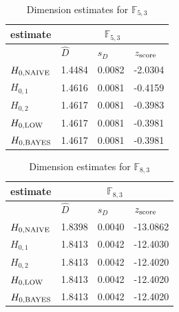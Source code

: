 \documentclass[a4paper,10pt]{article}
\begin{document}
\begin{thebibliography}{99}
\begin{table}[H] 
\begin{center}
\caption{Dimension estimates for $\mathbb{F}_{5,3}$}
\label{tab:est3}
\begin{tabular}{|l|l|l|l|}
\hline
 estimate & \multicolumn{3}{c|}{$\mathbb{F}_{5,3}$} \\
\hline
 & $\hat{D}$ & $s_{D}$ & $z_{\mbox{\scriptsize{score}}}$ \\
\hline 
$ H_{0,\mbox{\scriptsize{NAIVE}}}  $ & 1.4484 & 0.0082 & -2.0304 \\ 
\hline 
$ H_{0,1} $ & 1.4616 & 0.0081 & -0.4159 \\ 
\hline 
$ H_{0,2} $ & 1.4617 & 0.0081 & -0.3983 \\ 
\hline 
$ H_{0,\mbox{\scriptsize{LOW}}} $ & 1.4617 & 0.0081 & -0.3981 \\ 
\hline 
$ H_{0,\mbox{\scriptsize{BAYES}}} $ & 1.4617 & 0.0081 & -0.3981 \\ 
\hline 
\end{tabular}
\end{center}
\end{table}

\begin{table}[H] 
\begin{center}
\caption{Dimension estimates for $\mathbb{F}_{8,3}$}
\label{tab:est4}
\begin{tabular}{|l|l|l|l|}
\hline
 estimate & \multicolumn{3}{c|}{$\mathbb{F}_{8,3}$} \\
\hline
 & $\hat{D}$ & $s_{D}$ & $z_{\mbox{\scriptsize{score}}}$ \\
\hline
$ H_{0,\mbox{\scriptsize{NAIVE}}} $ & 1.8398 & 0.0040 & -13.0862 \\ 
\hline 
$ H_{0,1} $ & 1.8413 & 0.0042 & -12.4030 \\ 
\hline 
$ H_{0,2} $ & 1.8413 & 0.0042 & -12.4020 \\ 
\hline 
$ H_{0,\mbox{\scriptsize{LOW}}} $ & 1.8413 & 0.0042 & -12.4020 \\ 
\hline 
$ H_{0,\mbox{\scriptsize{BAYES}}} $ & 1.8413 & 0.0042 & -12.4020 \\ 
\hline 
\end{tabular}
\end{center}
\end{table}








\end{thebibliography}
\end{document}
